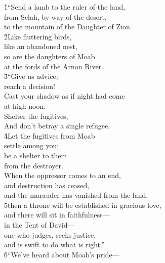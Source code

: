\begin{poetry}
\poeml {}
\v{1}``Send a lamb to the ruler of the land, \\
\poemll    from Selah, by way of the desert, \\
\poemlll       to the mountain of the Daughter of Zion. \\
\poeml \v{2}Like fluttering birds, \\
\poemll    like an abandoned nest, \\
\poeml so are the daughters of Moab \\
\poemll    at the fords of the Arnon River. \\
\poeml \v{3}``Give us advice; \\
\poemll    reach a decision! \\
\poeml Cast your shadow as if night had come \\
\poemll    at high noon. \\
\poeml Shelter the fugitives, \\
\poemll    And don't betray a single refugee. \\
\poeml \v{4}Let the fugitives from Moab \\
\poemll    settle among you; \\
\poeml be a shelter to them \\
\poemll    from the destroyer. \\
\poeml When the oppressor comes to an end, \\
\poemll    and destruction has ceased, \\
\poemlll       and the marauder has vanished from the land, \\
\poeml \v{5}then a throne will be established in gracious love, \\
\poemll    and there will sit in faithfulness--- \\
\poemlll       in the Tent of David--- \\
\poeml one who judges, seeks justice, \\
\poemll    and is swift to do what is right.'' \\
\poeml \v{6}``We've heard about Moab's pride--- \\

\end{poetry}
